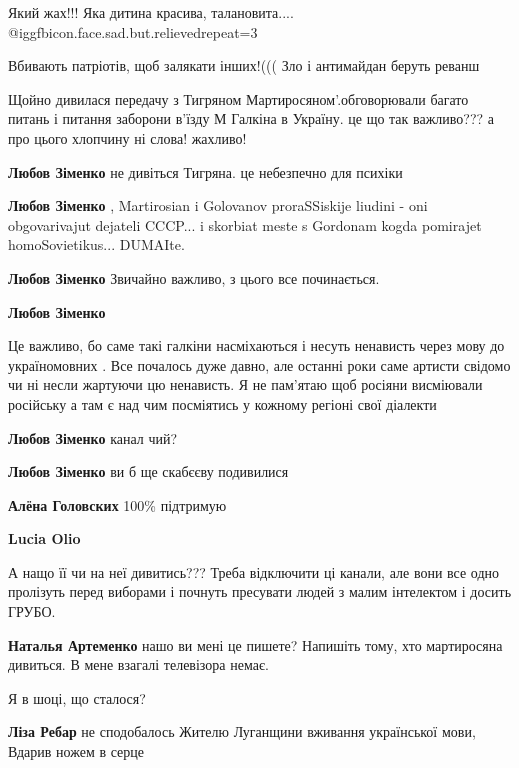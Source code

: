 \begin{itemize}
Який жах!!! Яка дитина красива, талановита.... @igg{fbicon.face.sad.but.relieved}{repeat=3} 

Вбивають патріотів, щоб залякати інших!((( Зло і антимайдан беруть реванш


Щойно дивилася передачу з Тигряном Мартиросяном'.обговорювали багато питань і
питання заборони в'їзду М Галкіна в Україну. це що так важливо??? а про цього
хлопчину ні слова! жахливо!

\begin{itemize} %
\textbf{Любов Зіменко} не дивіться Тигряна. це небезпечно для психіки

\textbf{Любов Зіменко} , Martirosian i Golovanov proraSSiskije liudini - oni obgovarivajut dejateli CCCP... i skorbiat meste s Gordonam kogda pomirajet homoSovietikus... DUMAIte.

\textbf{Любов Зіменко} Звичайно важливо, з цього все починається.

\textbf{Любов Зіменко} 

Це важливо, бо саме такі галкіни насміхаються і несуть ненависть через мову до
україномовних . Все почалось дуже давно, але останні роки саме артисти свідомо
чи ні несли жартуючи цю ненависть. Я не пам'ятаю щоб росіяни висміювали
російську а там є над чим посміятись у кожному регіоні свої діалекти

\textbf{Любов Зіменко} канал чий?

\textbf{Любов Зіменко} ви б ще скабєєву подивилися

\textbf{Алёна Головских} 100\% підтримую

\textbf{Lucia Olio} 

А нащо її чи на неї дивитись??? Треба відключити ці канали, але вони все одно
пролізуть перед виборами і почнуть пресувати людей з малим інтелектом і досить
ГРУБО.

\textbf{Наталья Артеменко} нашо ви мені це пишете? Напишіть тому, хто мартиросяна дивиться. В мене взагалі телевізора немає.

\end{itemize} %


Я в шоці, що сталося?

\begin{itemize} %
\textbf{Ліза Ребар} не сподобалось
Жителю Луганщини вживання української мови,
Вдарив ножем в серце
\end{itemize} %


\end{itemize}
